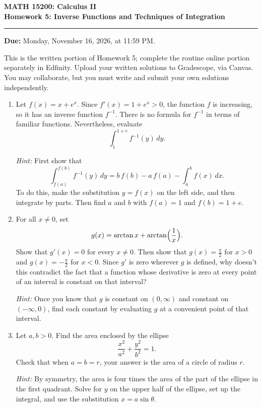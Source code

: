 \documentclass[12pt,letterpaper]{article}
\begin{document}
\begin{center}
  {\large\bfseries MATH 15200: Calculus II}\\
  {\large\bfseries Homework 5: Inverse Functions and Techniques of Integration}
\end{center}

\vspace{0.25em}
\hrule
\vspace{0.8em}

\textbf{Due:} Monday, November 16, 2026, at 11:59 PM.

This is the written portion of Homework 5; complete the routine online portion
separately in Edfinity. Upload your written solutions to Gradescope, via Canvas. You may
collaborate, but you must write and submit your own solutions independently.



\vspace{0.8em}


\begin{enumerate}[label=\textbf{\arabic*.},leftmargin=2em,itemsep=1.25em]
  \item Let $f(x)=x+e^x$. Since $f'(x)=1+e^x>0$, the function $f$ is
    increasing, so it has an inverse function $f^{-1}$. There is no formula
    for $f^{-1}$ in terms of familiar functions. Nevertheless, evaluate
    \[
      \int_1^{1+e}f^{-1}(y)\,dy.
    \]

    \emph{Hint:} First show that 
    \[
      \int_{f(a)}^{f(b)}f^{-1}(y)\,dy=b\,f(b)-a\,f(a)-\int_a^b f(x)\,dx.
    \]
    To do this, make the substitution $y=f(x)$ on the left side, and then
    integrate by parts. Then find $a$ and $b$ with $f(a)=1$ and $f(b)=1+e$.

  \item For all $x \neq 0$, set 
    \[
      g(x)=\arctan x+\arctan\Bigl(\frac1x\Bigr).
    \]
    Show that $g'(x)=0$ for every $x\ne0$. Then show that
    $g(x)=\frac\pi2$ for $x>0$ and $g(x)=-\frac\pi2$ for $x<0$. Since $g'$
    is zero wherever $g$ is defined, why doesn't this contradict the fact that
    a function whose derivative is zero at every point of an interval is
    constant on that interval?

    \emph{Hint:} Once you know that $g$ is constant on $(0,\infty)$ and
    constant on $(-\infty,0)$, find each constant by evaluating $g$ at a
    convenient point of that interval.

  \item Let $a,b>0$. Find the area enclosed by the ellipse
    \[
      \frac{x^2}{a^2}+\frac{y^2}{b^2}=1.
    \]
    Check that when $a=b=r$, your answer is the area of a circle of radius
    $r$.

    \emph{Hint:} By symmetry, the area is four times the area of the part of
    the ellipse in the first quadrant. Solve for $y$ on the upper half of the
    ellipse, set up the integral, and use the substitution $x=a\sin\theta$.
\end{enumerate}
\end{document}
